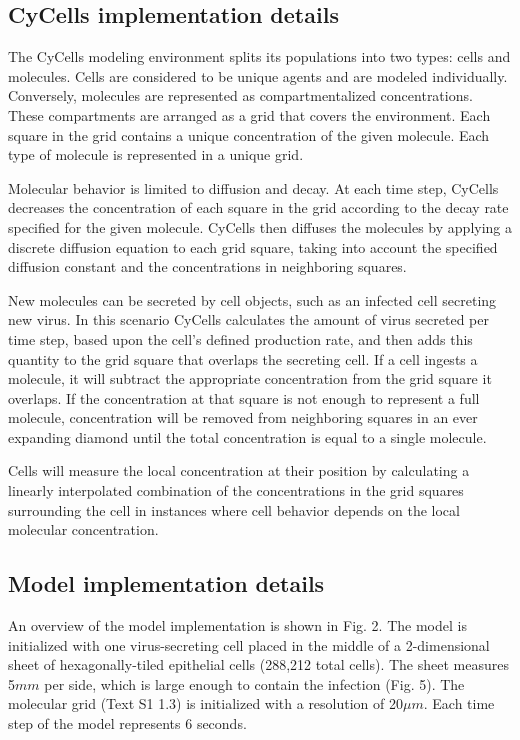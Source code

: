 \documentclass[10pt]{article}
\begin{document}
\subsection{CyCells implementation details}

The CyCells modeling environment splits its populations into two types: cells and molecules.  Cells are considered to be unique agents and are modeled individually.  Conversely, molecules are represented as compartmentalized concentrations.  These compartments are arranged as a grid that covers the environment.  Each square in the grid contains a unique concentration of the given molecule.  Each type of  molecule is represented in a unique grid.

Molecular behavior is limited to diffusion and decay.  At each time step, CyCells decreases the concentration of each square in the grid according to the decay rate specified for the given molecule.  CyCells then diffuses the molecules by applying a discrete diffusion equation to each grid square, taking into account the specified diffusion constant and the concentrations in neighboring squares.

New molecules can be secreted by cell objects, such as an infected cell secreting new virus.  In this scenario CyCells calculates the amount of virus secreted per time step, based upon the cell's defined production rate, and then adds this quantity to the grid square that overlaps the secreting cell.  If a cell ingests a molecule, it will subtract the appropriate concentration from the grid square it overlaps.  If the concentration at that square is not enough to represent a full molecule, concentration will be removed from neighboring squares in an ever expanding diamond until the total concentration is equal to a single molecule.

Cells will measure the local concentration at their position by calculating a linearly interpolated combination of the concentrations in the grid squares surrounding the cell in instances where cell behavior depends on the local molecular concentration.


\subsection{Model implementation details}

An overview of the model implementation is shown in Fig. 2.  The model is initialized with one virus-secreting cell placed in the middle of a 2-dimensional sheet of hexagonally-tiled epithelial cells (288,212 total cells).  The sheet measures 5$mm$ per side, which is large enough to contain the infection (Fig. 5).  The molecular grid (Text S1 1.3) is initialized with a resolution of 20$\mu m$.  Each time step of the model represents 6 seconds.
\end{document}
